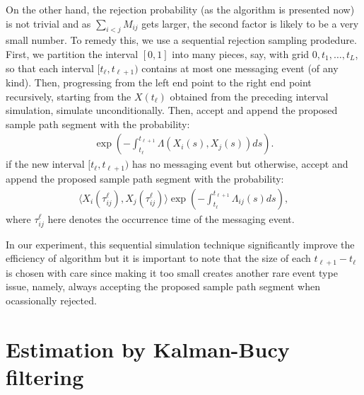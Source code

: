 \documentclass[12pt]{article}%
\begin{document}
On the other hand, the rejection probability (as the algorithm is presented now) is not trivial 
and as $\sum_{i<j} M_{ij}$ gets larger, the second factor is likely to be a very small number.  
To remedy this, we use a sequential rejection sampling prodedure.  
First, we partition the interval $[0,1]$ into many pieces, say, with grid $0,t_1,\ldots, t_L$, 
so that each interval $[t_{\ell},t_{\ell+1})$ contains at most one messaging event (of any kind). 
Then, progressing from the left end point to the right end point recursively, starting 
from the $X(t_{\ell})$ obtained from the preceding interval simulation, simulate unconditionally.  
Then, accept and append the proposed sample path segment with the probability:
\begin{eqnarray}
\exp\left(-\int_{t_{\ell}}^{t_{\ell+1}} \Lambda(X_i(s),X_j(s)) ds\right).
\end{eqnarray}
if the new interval $[t_{\ell},t_{\ell+1})$ has no messaging event but otherwise, accept and append the proposed sample path segment with the probability:
\begin{eqnarray}
\langle X_i(\tau_{ij}^\ell),X_j(\tau_{ij}^\ell)\rangle 
\exp\left(-\int_{t_{\ell}}^{t_{\ell+1}} \Lambda_{ij}(s) ds\right),
\end{eqnarray}
where $\tau_{ij}^\ell$ here denotes the occurrence time of the messaging event.

In our experiment, this sequential simulation technique significantly improve the efficiency of algorithm 
but it is important to note that the size of each $t_{\ell+1} - t_\ell$ is chosen with care since making 
it too small creates another rare event type issue, namely, always accepting the proposed sample path 
segment when ocassionally rejected.   


\section{Estimation by Kalman-Bucy filtering}
\end{document}
